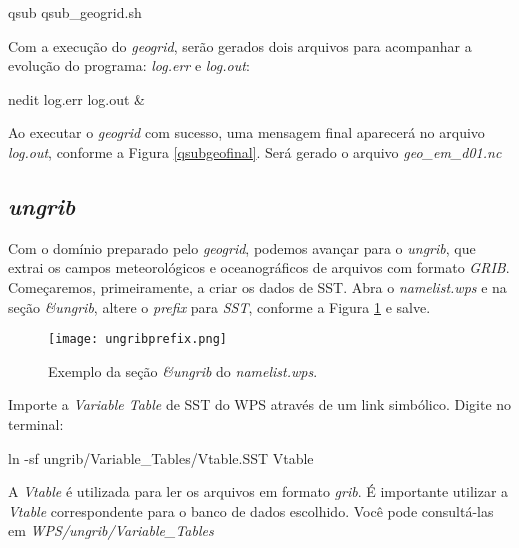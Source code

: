 \begin{bashcode}
qsub qsub_geogrid.sh
\end{bashcode}
\bigskip

\noindent Com a execução do \textit{geogrid}, serão gerados dois arquivos para acompanhar a evolução do programa: \textit{log.err} e \textit{log.out}:
\bigskip

\begin{bashcode}
nedit log.err log.out &
\end{bashcode}
\bigskip

\noindent Ao executar o \textit{geogrid} com sucesso, uma mensagem final aparecerá no arquivo \textit{log.out}, conforme a Figura \textcolor{bleu_cite}{\ref{qsubgeofinal}}. Será gerado o arquivo \textit{geo\_em\_d01.nc}
\bigskip


\subsection{\textit{ungrib}}\label{ungribsecao}
\bigskip
\noindent Com o domínio preparado pelo \textit{geogrid}, podemos avançar para o \textit{ungrib}, que extrai os campos meteorológicos 
          e oceanográficos de arquivos com formato \textit{GRIB}. Começaremos, primeiramente, a criar os dados de SST. Abra o \textit{namelist.wps} 
          e na seção \textit{\&ungrib}, altere o \textit{prefix} para \textit{SST}, conforme a Figura \ref{ungribprefix} e salve.
\bigskip

\begin{figure}[H]
    \centering
    \texttt{[image: ungribprefix.png]}
    \caption{Exemplo da seção \textit{\&ungrib} do \textit{namelist.wps}.}
    \label{ungribprefix}
\end{figure}
\bigskip

\noindent Importe a \textit{Variable Table} de SST do WPS através de um link simbólico. Digite no terminal:
\bigskip

\begin{bashcode}
ln -sf ungrib/Variable_Tables/Vtable.SST Vtable
\end{bashcode}
\bigskip

\begin{tcolorbox}[enhanced,
  grow to left by=0cm,%
  grow to right by=0cm,%
  enlarge top by=0cm,%
  enlarge bottom by=0cm,%
  tcbox raise base,
  boxrule=1.0pt,
  left=18mm,
  colframe=red!50!black,coltext=red!25!black,colback=red!10!white,
  overlay={\begin{tcbclipinterior}\fill[red!75!blue!50!white] (frame.south west)
    rectangle node[text=white,font=\sffamily\bfseries\footnotesize,rotate=0] {ATENÇÃO} ([xshift=18mm]frame.north west);\end{tcbclipinterior}}]
A \textit{Vtable} é utilizada para ler os arquivos em formato \textit{grib}. É importante utilizar a \textit{Vtable} correspondente para o banco de dados escolhido. Você pode consultá-las em \textit{WPS/ungrib/Variable\_Tables}
\end{tcolorbox}
\bigskip

